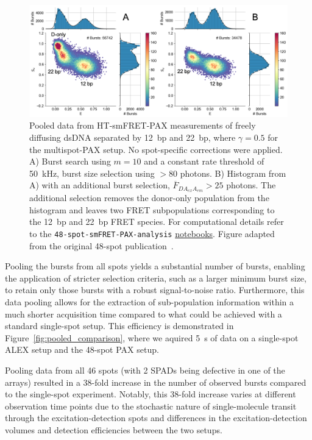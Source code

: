\begin{figure}
\centering
\includegraphics[width=1.0\linewidth]{chapters/figures/pooled_mixed-pop.png}
\caption{\label{fig:pooled_mixed} 
Pooled data from \ac{HT-smFRET}-PAX measurements of freely diffusing dsDNA separated by 12~\ac{bp} and 22~\ac{bp}, where $\gamma= 0.5$ for the multispot-PAX setup. 
No spot-specific corrections were applied. 
A) Burst search using $m = 10$ and a constant rate threshold of 50~kHz, burst size selection using  $> 80$ photons. 
B) Histogram from A) with an additional burst selection, $\overline{F}_{DA_{ex}A_{em}} > 25$ photons. 
The additional selection removes the donor-only population from the histogram and leaves two FRET subpopulations 
corresponding to the 12~\ac{bp} and 22~\ac{bp} FRET species.
For computational details refer to the \texttt{48-spot-smFRET-PAX-analysis} \href{https://github.com/tritemio/48-spot-smFRET-PAX-analysis}{notebooks}.
Figure adapted from the original 48-spot publication~\cite{ingargiola_JCP_2018}.}
\end{figure}

Pooling the bursts from all spots yields a substantial number of bursts, enabling the application of stricter selection criteria, such as a larger minimum burst size, to retain only those bursts with a robust signal-to-noise ratio. 
Furthermore, this data pooling allows for the extraction of sub-population information within a much shorter acquisition time compared to what could be achieved with a standard single-spot setup. 
This efficiency is demonstrated in Figure~\ref{fig:pooled_comparison}, where we aquired 5~s of data on a single-spot \ac{ALEX} setup and the 48-spot \ac{PAX} setup.

Pooling data from all 46 spots (with 2 \ac{SPAD}s being defective in one of the arrays) resulted in a 38-fold increase in the number of observed bursts compared to the single-spot experiment. 
Notably, this 38-fold increase varies at different observation time points due to the stochastic nature of single-molecule transit through the excitation-detection spots and differences in the excitation-detection volumes and detection efficiencies between the two setups.

